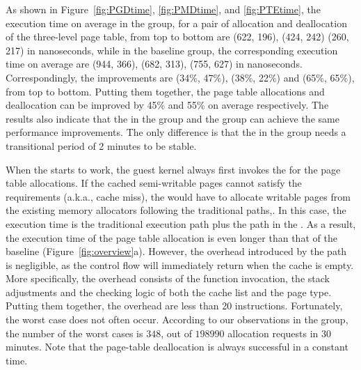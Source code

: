 As shown in Figure~\ref{fig:PGDtime}, \ref{fig:PMDtime}, and \ref{fig:PTEtime}, the execution time on average in the \prename group, for a pair of allocation and deallocation of the three-level page table, from top to bottom are (622, 196), (424, 242) (260, 217) in nanoseconds, while in the baseline group, the corresponding execution time on average are (944, 366), (682, 313), (755, 627) in nanoseconds. Correspondingly, the improvements are (34\%, 47\%), (38\%, 22\%) and (65\%, 65\%), from top to bottom.
Putting them together, the page table allocations and deallocation can be improved by 45\% and 55\% on average respectively.
The results also indicate that the \name in the \dynname group and the \prename group can achieve the same performance improvements.
The only difference is that the \name in the \dynname group needs a transitional period of 2 minutes to be stable.

When the \name starts to work, the guest kernel always first invokes the \cache for the page table allocations.
If the cached semi-writable pages cannot satisfy the requirements (a.k.a., cache miss), the \cache would have to allocate writable pages from the existing memory allocators following the traditional paths,.
In this case, the execution time is the traditional execution path plus the path in the \cache.
As a result, the execution time of the page table allocation is even longer than that of the baseline (Figure~\ref{fig:overview}a).
However, the overhead introduced by the \name path is negligible, as the control flow will immediately return when the cache is empty.
More specifically, the overhead consists of the function invocation, the stack adjustments and the checking logic of both the cache list and the page type.
Putting them together, the overhead are less than 20 instructions.
Fortunately, the worst case does not often occur. According to our observations in the \dynname group, the number of the worst cases is $348$, out of $198990$ allocation requests in 30 minutes.
Note that the page-table deallocation is always successful in a constant time.


